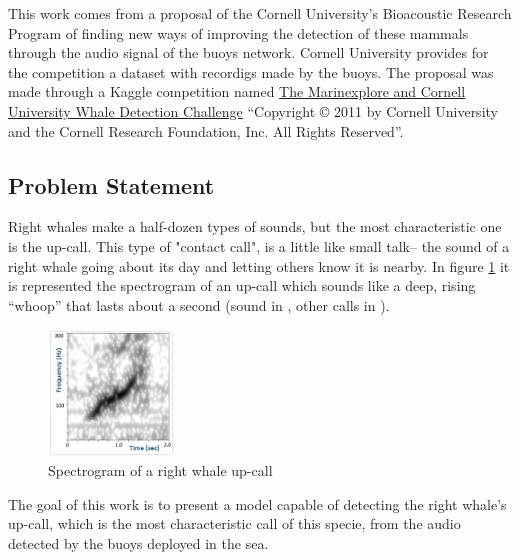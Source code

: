 \documentclass[]{article}
\newcommand{\competition}{The Marinexplore and Cornell University Whale Detection Challenge}
\newcommand{\copyrighting}{“Copyright © 2011 by Cornell University and the Cornell Research Foundation, Inc. All Rights Reserved”}
\begin{document}
This work comes from a proposal of the Cornell University's Bioacoustic Research Program of finding new ways of improving the detection of these mammals through the audio signal of the buoys network.  Cornell University provides for the competition a dataset with recordigs made by the buoys. The proposal was made through a Kaggle competition named \href{https://www.kaggle.com/c/whale-detection-challenge}{\competition} \cite{kagglewhale} \copyrighting.

\subsection{Problem Statement}\label{problem-statement}

Right whales make a half-dozen types of sounds, but the most characteristic one is the up-call. This type of "contact call",  is a little like small talk-- the sound of a right whale going about its day and letting others know it is nearby. In figure \ref{img:upcall} it is represented the spectrogram of an up-call which sounds like a deep, rising “whoop” that lasts about a second (sound in \cite{CornellWeb}, other calls in \cite{CornellWeb2}).

\begin{figure}[htpb!]
\centering
\includegraphics[width= 0.3\textwidth]{images/sound_upcall_quiet.jpg}
\caption{Spectrogram of a right whale up-call \cite{CornellWeb} \label{img:upcall}}
\end{figure}
The goal of this work is to present a model capable of detecting the right whale's up-call, which is the most characteristic call of this specie, from the audio detected by the buoys deployed in the sea.
\end{document}
